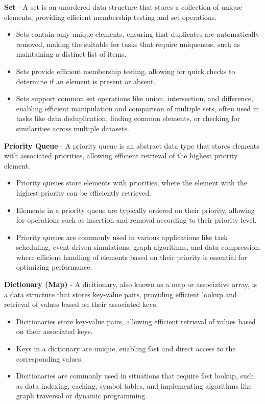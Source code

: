 \begin{solution}
    \textbf{Set} - A set is an unordered data structure that stores a collection of unique elements, providing efficient membership testing and set operations.
    \begin{itemize}
        \item Sets contain only unique elements, ensuring that duplicates are automatically removed, making the suitable for tasks that require uniqueness, such as maintaining a distinct
        list of items.
        \item Sets provide efficient membership testing, allowing for quick checks to determine if an element is present or absent.
        \item Sets support common set operations like union, intersection, and difference, enabling efficient manipulation and comparison of multiple sets, often used in tasks like data
        deduplication, finding common elements, or checking for similarities across multiple datasets.
    \end{itemize}
    
    \textbf{Priority Queue} - A priority queue is an abstract data type that stores elements with associated priorities, allowing efficient retrieval of the highest priority element.
    \begin{itemize}
        \item Priority queues store elements with priorities, where the element with the highest priority can be efficiently retrieved.
        \item Elements in a priority queue are typically ordered on their priority, allowing for operations such as insertion and removal according to their priority level.
        \item Priority queues are commonly used in various applications like task scheduling, event-driven simulations, graph algorithms, and data compression, where efficient handling of elements
        based on their priority is essential for optimizing performance.
    \end{itemize}

    \textbf{Dictionary (Map)} - A dicitionary, also known as a map or associative array, is a data structure that stores key-value pairs, providing efficient lookup and retrieval of values
    based on their associated keys.
    \begin{itemize}
        \item Dicitionaries store key-value pairs, allowing efficient retrieval of values based on their associated keys.
        \item Keys in a dictionary are unique, enabling fast and direct access to the corresponding values.
        \item Dicitionaries are commonly used in situations that require fast lookup, such as data indexing, caching, symbol tables, and implementing algorithms like graph traversal or dynamic programming.
    \end{itemize}
\end{solution}

